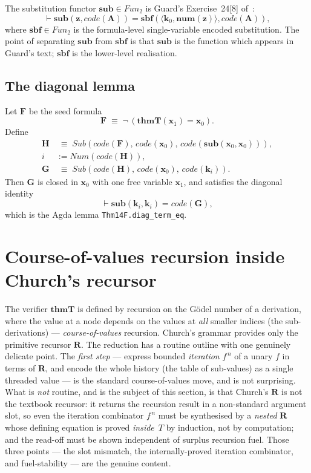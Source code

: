 \documentclass[11pt]{article}
\theoremstyle{plain}
\theoremstyle{definition}
\theoremstyle{remark}
\newcommand{\code}[1]{\mathit{code}(#1)}
\newcommand{\sub}{\mathbf{sub}}
\newcommand{\sbf}{\mathbf{sbf}}
\newcommand{\thmT}{\mathbf{thmT}}
\newcommand{\num}{\mathbf{num}}
\newcommand{\seq}[1]{\langle #1 \rangle}
\newcommand{\Fun}{\mathit{Fun}}
\newcommand{\Sub}{\mathit{Sub}}
\newcommand{\Num}{\mathit{Num}}
\begin{document}
The substitution functor $\sub \in \Fun_2$ is Guard's Exercise~24[8]
of~\cite{Guard63}:
\[
\vdash \sub(\mathbf{z}, \code{\mathbf{A}}) = \sbf(\seq{\mathbf{k}_0, \num(\mathbf{z})}, \code{\mathbf{A}}),
\]
where $\sbf \in \Fun_2$ is the formula-level single-variable encoded
substitution.  The point of separating $\sub$ from $\sbf$ is that
$\sub$ is the function which appears in Guard's text; $\sbf$ is the
lower-level realisation.

\subsection{The diagonal lemma}

Let $\mathbf{F}$ be the seed formula
\[
\mathbf{F} \;\equiv\; \neg\,(\thmT(\mathbf{x}_1) = \mathbf{x}_0).
\]
Define
\begin{align*}
\mathbf{H} &\;\equiv\; \Sub(\code{\mathbf{F}},\, \code{\mathbf{x}_0},\, \code{\sub(\mathbf{x}_0, \mathbf{x}_0)}), \\
i &:= \Num(\code{\mathbf{H}}), \\
\mathbf{G} &\;\equiv\; \Sub(\code{\mathbf{H}},\, \code{\mathbf{x}_0},\, \code{\mathbf{k}_i}).
\end{align*}
Then $\mathbf{G}$ is closed in $\mathbf{x}_0$ with one free variable
$\mathbf{x}_1$, and satisfies the diagonal identity
\[
\vdash \sub(\mathbf{k}_i, \mathbf{k}_i) = \code{\mathbf{G}},
\]
which is the Agda lemma \texttt{Thm14F.diag\_term\_eq}.

\section{Course-of-values recursion inside Church's recursor}
\label{sec:cov}

The verifier $\thmT$ is defined by recursion on the G\"odel number of a
derivation, where the value at a node depends on the values at
\emph{all} smaller indices (the sub-derivations) --- \emph{course-of-values}
recursion.  Church's grammar provides only the primitive recursor
$\mathbf{R}$.  The reduction has a routine outline with one genuinely
delicate point.  The \emph{first step} --- express bounded \emph{iteration}
$f^{\,n}$ of a unary $f$ in terms of $\mathbf{R}$, and encode the whole
history (the table of sub-values) as a single threaded value --- is the
standard course-of-values move, and is not surprising.  What is \emph{not}
routine, and is the subject of this section, is that Church's $\mathbf{R}$
is not the textbook recursor: it returns the recursion result in a
non-standard argument slot, so even the iteration combinator $f^{\,n}$ must
be synthesised by a \emph{nested} $\mathbf{R}$ whose defining equation is
proved \emph{inside}~$T$ by induction, not by computation; and the read-off
must be shown independent of surplus recursion fuel.  Those three points
--- the slot mismatch, the internally-proved iteration combinator, and
fuel-stability --- are the genuine content.
\end{document}
